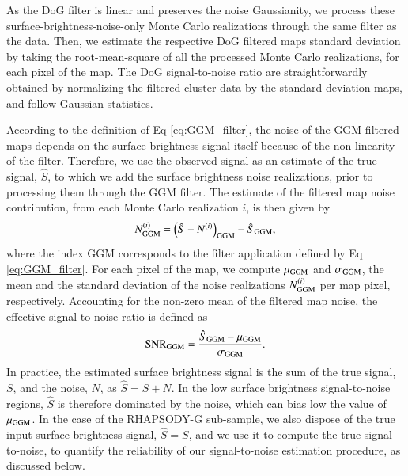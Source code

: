 \documentclass[twocolumn,traditabstract]{aa}
\begin{document}
As the DoG filter is linear and preserves the noise Gaussianity, we process these surface-brightness-noise-only Monte Carlo realizations through the same filter as the data. Then, we estimate the respective DoG filtered maps standard deviation by taking the root-mean-square of all the processed Monte Carlo realizations, for each pixel of the map. The DoG signal-to-noise ratio are straightforwardly obtained by normalizing the filtered cluster data by the standard deviation maps, and follow Gaussian statistics.

According to the definition of Eq \ref{eq:GGM_filter}, the noise of the GGM filtered maps depends on the surface brightness signal itself because of the non-linearity of the filter. Therefore, we use the observed signal as an estimate of the true signal, $\hat{S}$, to which we add the surface brightness noise realizations, prior to processing them through the GGM filter. The estimate of the filtered map noise contribution, from each Monte Carlo realization $i$, is then given by
\begin{equation}
	N^{(i)}_{\rm GGM} = \left(\hat{S} + N^{(i)}\right)_{\rm GGM} -  \hat{S}_{\rm GGM},
	\label{eq:GGM_filter_noise}
\end{equation}
where the index GGM corresponds to the filter application defined by Eq \ref{eq:GGM_filter}. For each pixel of the map, we compute $\mu_{\rm GGM}$ and $\sigma_{\rm GGM}$, the mean and the standard deviation of the noise realizations $N^{(i)}_{\rm GGM}$ per map pixel, respectively. Accounting for the non-zero mean of the filtered map noise, the effective signal-to-noise ratio is defined as 
\begin{equation}
{\rm SNR}_{\rm GGM} = \frac{\hat{S}_{\rm GGM} - \mu_{\rm GGM}}{\sigma_{\rm GGM}}.
	\label{eq:GGM_filter_snr}
\end{equation}
In practice, the estimated surface brightness signal is the sum of the true signal, $S$, and the noise, $N$, as $\hat{S} = S + N$. In the low surface brightness signal-to-noise regions, $\hat{S}$ is therefore dominated by the noise, which can bias low the value of $\mu_{\rm GGM}$. In the case of the RHAPSODY-G sub-sample, we also dispose of the true input surface brightness signal, $\hat{S} = S$, and we use it to compute the true signal-to-noise, to quantify the reliability of our signal-to-noise estimation procedure, as discussed below.
\end{document}
